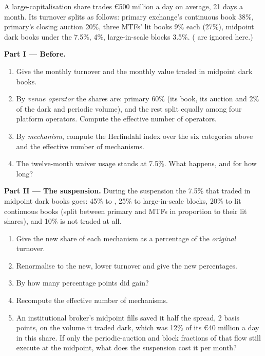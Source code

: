 \begin{problem}\label{pb:m1:european-equity-market-structure:1}
A large-capitalisation share trades \euro 500 million a day on average, 21
days a month. Its turnover splits as follows: primary exchange's continuous
book 38\%, primary's closing auction 20\%, three MTFs' lit books 9\% each (27\%),
midpoint dark books under the  7.5\%, 
4\%, large-in-scale blocks 3.5\%. ( are ignored
here.)

\medskip\noindent\textbf{Part I --- Before.}
\begin{enumerate}
\item Give the monthly turnover and the monthly value traded in midpoint dark
books.
\item By \emph{venue operator} the shares are: primary 60\% (its book, its
auction and 2\% of the dark and periodic volume), and the rest split equally
among four platform operators. Compute the effective number of operators.
\item By \emph{mechanism}, compute the Herfindahl index over the six
categories above and the effective number of mechanisms.
\item The twelve-month waiver usage stands at 7.5\%. What happens, and for
how long?
\end{enumerate}

\medskip\noindent\textbf{Part II --- The suspension.}
During the suspension the 7.5\% that traded in midpoint dark books goes: 45\%
to , 25\% to large-in-scale blocks, 20\% to lit continuous
books (split between primary and MTFs in proportion to their lit shares), and
10\% is not traded at all.
\begin{enumerate}[resume]
\item Give the new share of each mechanism as a percentage of the
\emph{original} turnover.
\item Renormalise to the new, lower turnover and give the new percentages.
\item By how many percentage points did  gain?
\item Recompute the effective number of mechanisms.
\item An institutional broker's midpoint fills saved it half the spread, 2
basis points, on the volume it traded dark, which was 12\% of its \euro 40
million a day in this share. If only the periodic-auction and block fractions
of that flow still execute at the midpoint, what does the suspension cost it
per month?
\end{enumerate}


\end{problem}
